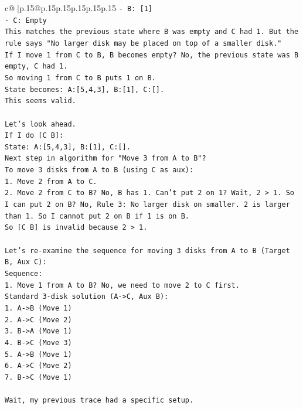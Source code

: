 \documentclass{article}
\begin{document}
{\begin{supertabular}{c@{$\;$}|p{.15\linewidth}@{}p{.15\linewidth}p{.15\linewidth}p{.15\linewidth}p{.15\linewidth}p{.15\linewidth}}
{{{\texttt{{-} B: {[}1{]}} \\
\texttt{{-} C: Empty} \\
\texttt{This matches the previous state where B was empty and C had 1. But the rule says "No larger disk may be placed on top of a smaller disk."} \\
\texttt{If I move 1 from C to B, B becomes empty? No, the previous state was B empty, C had 1.} \\
\texttt{So moving 1 from C to B puts 1 on B.} \\
\texttt{State becomes: A:{[}5,4,3{]}, B:{[}1{]}, C:{[}{]}.} \\
\texttt{This seems valid.} \\
\\ 
\texttt{Let's look ahead.} \\
\texttt{If I do {[}C B{]}:} \\
\texttt{State: A:{[}5,4,3{]}, B:{[}1{]}, C:{[}{]}.} \\
\texttt{Next step in algorithm for "Move 3 from A to B"?} \\
\texttt{To move 3 disks from A to B (using C as aux):} \\
\texttt{1. Move 2 from A to C.} \\
\texttt{2. Move 2 from C to B? No, B has 1. Can't put 2 on 1? Wait, 2 > 1. So I can put 2 on B? No, Rule 3: No larger disk on smaller. 2 is larger than 1. So I cannot put 2 on B if 1 is on B.} \\
\texttt{So {[}C B{]} is invalid because 2 > 1.} \\
\\ 
\texttt{Let's re{-}examine the sequence for moving 3 disks from A to B (Target B, Aux C):} \\
\texttt{Sequence:} \\
\texttt{1. Move 1 from A to B? No, we need to move 2 to C first.} \\
\texttt{Standard 3{-}disk solution (A{-}>C, Aux B):} \\
\texttt{1. A{-}>B (Move 1)} \\
\texttt{2. A{-}>C (Move 2)} \\
\texttt{3. B{-}>A (Move 1)} \\
\texttt{4. B{-}>C (Move 3)} \\
\texttt{5. A{-}>B (Move 1)} \\
\texttt{6. A{-}>C (Move 2)} \\
\texttt{7. B{-}>C (Move 1)} \\
\\ 
\texttt{Wait, my previous trace had a specific setup.} \\
}}}
\end{supertabular}}
\end{document}
